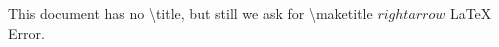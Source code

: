 \documentclass{article}
\begin{document}
This  document has  no  \textbackslash  title, but  still  we ask  for
\textbackslash maketitle $rightarrow$ LaTeX Error.

\maketitle
\end{document}

